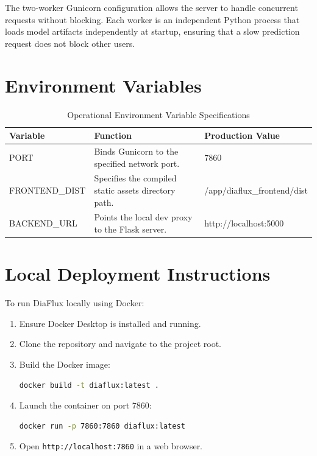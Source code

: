 \documentclass[12pt,a4paper]{report}
\begin{document}
The two-worker Gunicorn configuration allows the server to handle concurrent requests without blocking. Each worker is an independent Python process that loads model artifacts independently at startup, ensuring that a slow prediction request does not block other users.

\section{Environment Variables}
\begin{table}[H]
\centering
\caption{Operational Environment Variable Specifications}
\label{tab:env_vars}
\begin{tabular}{lll}
\toprule
\textbf{Variable} & \textbf{Function} & \textbf{Production Value} \\
\midrule
PORT             & Binds Gunicorn to the specified network port. & 7860 \\
FRONTEND\_DIST   & Specifies the compiled static assets directory path. & /app/diaflux\_frontend/dist \\
BACKEND\_URL     & Points the local dev proxy to the Flask server. & http://localhost:5000 \\
\bottomrule
\end{tabular}
\end{table}

\section{Local Deployment Instructions}
To run DiaFlux locally using Docker:
\begin{enumerate}
    \item Ensure Docker Desktop is installed and running.
    \item Clone the repository and navigate to the project root.
    \item Build the Docker image:
    \begin{lstlisting}[language=bash]
    docker build -t diaflux:latest .
    \end{lstlisting}
    \item Launch the container on port 7860:
    \begin{lstlisting}[language=bash]
    docker run -p 7860:7860 diaflux:latest
    \end{lstlisting}
    \item Open \texttt{http://localhost:7860} in a web browser.
\end{enumerate}
\end{document}
